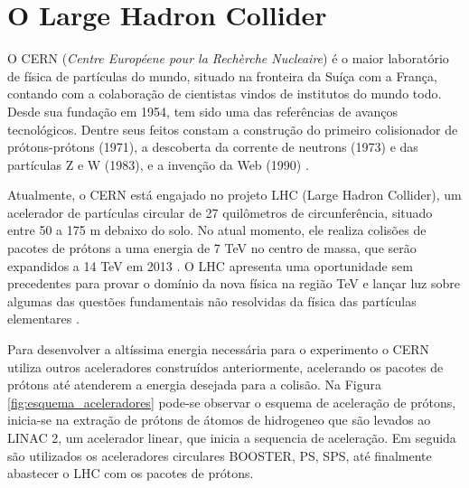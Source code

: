 \section{O Large Hadron Collider}
\label{sec:lhc}

O CERN ({\it Centre Européene pour la Rechèrche Nucleaire}) é o maior
laboratório de física de partículas do mundo, situado na fronteira da Suíça com
a França, contando com a colaboração de cientistas vindos de institutos
do mundo todo. Desde sua fundação em 1954, tem sido uma das referências de
avanços tecnológicos. Dentre seus feitos constam a construção do primeiro 
colisionador de prótons-prótons (1971), a descoberta 
da corrente de neutrons (1973) e das partículas Z e W (1983), 
e a invenção da Web (1990) \cite{webCERN}.

Atualmente, o CERN está engajado no projeto LHC (Large Hadron
Collider), um acelerador de partículas circular de 27 quilômetros de
circunferência, situado entre 50 a 175 m debaixo do solo. 
No atual momento, ele realiza colisões de pacotes de prótons a uma energia
de 7 TeV no centro de massa, que serão expandidos a 14 TeV em 2013 \cite{webATLAS}.
O LHC apresenta uma oportunidade sem precedentes para provar o domínio da
nova física na região TeV e lançar luz sobre algumas das questões fundamentais
não resolvidas da física das partículas elementares \cite{hunt_for_physics}. 

Para desenvolver a altíssima energia necessária para o experimento o CERN 
utiliza outros aceleradores construídos anteriormente, acelerando os pacotes de prótons até atenderem
a energia desejada para a colisão. Na Figura \ref{fig:esquema_aceleradores} pode-se observar
o esquema de aceleração de prótons, inicia-se na extração de prótons de átomos
de hidrogeneo que são levados ao LINAC 2, um acelerador linear,
que inicia a sequencia de aceleração. Em seguida são utilizados os aceleradores
circulares BOOSTER, PS, SPS, até finalmente abastecer o LHC com os pacotes de
prótons.

